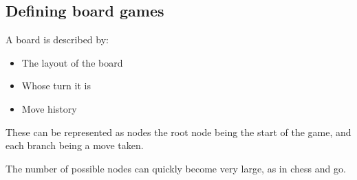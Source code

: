 
\subsection{Defining board games}

A board is described by:

\begin{itemize}
\item The layout of the board
\item Whose turn it is
\item Move history
\end{itemize}

These can be represented as nodes the root node being the start of the game, and each branch being a move taken.

The number of possible nodes can quickly become very large, as in chess and go.

